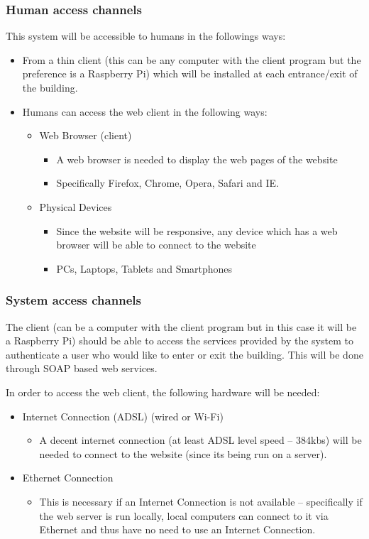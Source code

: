 \subsubsection{Human access channels}
This system will be accessible to humans in the followings ways:

	\begin{itemize}
		\item From a thin client (this can be any computer with the client program but the preference is a Raspberry Pi) which will be installed at each entrance/exit of the building.
		\item Humans can access the web client in the following ways:
		\begin{itemize}
			\item Web Browser (client)
				\begin{itemize}
					\item A web browser is needed to display the web pages of the website
					\item Specifically Firefox, Chrome, Opera, Safari and IE.
				\end{itemize}
			\item Physical Devices
			\begin{itemize}
				\item Since the website will be responsive, any device which has a web browser will be able to connect to the website
				\item PCs, Laptops, Tablets and Smartphones
			\end{itemize}
		\end{itemize}
	\end{itemize}
	
\subsubsection{System access channels}
The client (can be a computer with the client program but in this case it will be a Raspberry Pi) should be able to access the services provided by the system to authenticate a user who would like to enter or exit the building. This will be done through SOAP based web services.

In order to access the web client, the following hardware will be needed:
\begin{itemize}
	\item Internet Connection (ADSL) (wired or Wi-Fi)
	\begin{itemize}
		\item A decent internet connection (at least ADSL level speed – 384kbs) will be needed to connect to the website (since its being run on a server).
	\end{itemize}
	\item Ethernet Connection
	\begin{itemize}
		\item This is necessary if an Internet Connection is not available – specifically if the web server is run locally, local computers can connect to it via Ethernet and thus have no need to use an Internet Connection.
	\end{itemize}
\end{itemize}

